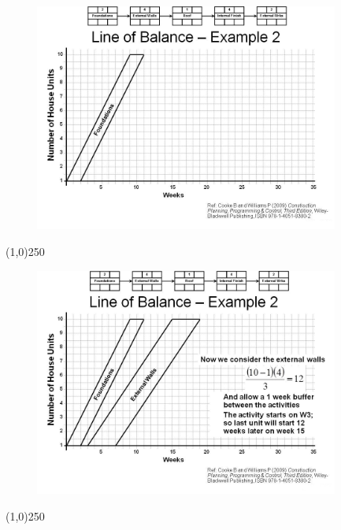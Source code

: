 \begin{frame}
\begin{figure}
	\centering
		\includegraphics[width = 10.0cm]{oldnotes/Slide258.jpg}
\end{figure}
\end{frame}
\begin{center}\line(1,0){250}\end{center}






\begin{frame}
\begin{figure}
	\centering
		\includegraphics[width = 10.0cm]{oldnotes/Slide259.jpg}
\end{figure}
\end{frame}
\begin{center}\line(1,0){250}\end{center}







